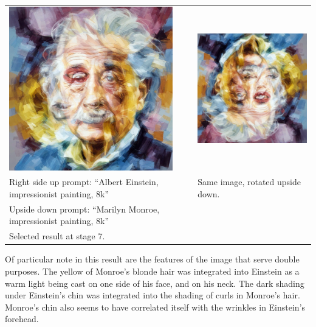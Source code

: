 \documentclass[12pt,letterpaper]{article}
\begin{document}
    \noindent\begin{tabular}{ >{\centering}m{2.9in} m{0.18in} >{\centering\arraybackslash}m{2.9in} }
        \includegraphics[width=2.8in]{img_einstein_monroe_7.png} & & \includegraphics[width=2.8in]{img_einstein_monroe_7_rotated.png} \\
        Right side up prompt: ``Albert Einstein, impressionist painting, 8k'' & & Same image, rotated upside down. \\
        Upside down prompt: ``Marilyn Monroe, impressionist painting, 8k'' & & \\
        Selected result at stage 7. & & \\
    \end{tabular}

    Of particular note in this result are the features of the image that serve double purposes. The yellow of Monroe's blonde hair was integrated into Einstein as a warm light being cast on one side of his face, and on his neck. The dark shading under Einstein's chin was integrated into the shading of curls in Monroe's hair. Monroe's chin also seems to have correlated itself with the wrinkles in Einstein's forehead.
\end{document}
